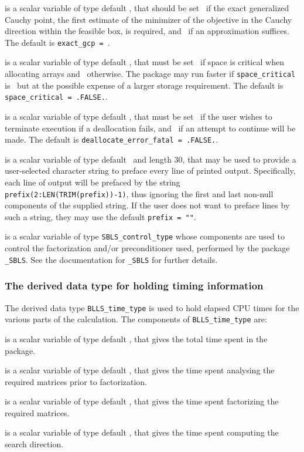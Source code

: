 \documentclass{galahad}
\newcommand{\packagename}{BLLS}
\begin{document}
\begin{description}
 is a scalar variable of type default \logical, that should
be set \true\ if the exact generalized Cauchy point,
the first estimate of the minimizer of the objective in the
Cauchy direction within
the feasible box, is required, and \false\ if an approximation suffices.
The default is {\tt exact\_gcp = \true}.

 is a scalar variable of type default \logical,
that must be set \true\ if space is critical when allocating arrays
and  \false\ otherwise. The package may run faster if
{\tt space\_critical} is \false\ but at the possible expense of a larger
storage requirement. The default is {\tt space\_critical = .FALSE.}.

 is a scalar variable of type default \logical,
that must be set \true\ if the user wishes to terminate execution if
a deallocation  fails, and \false\ if an attempt to continue
will be made. The default is {\tt deallocate\_error\_fatal = .FALSE.}.

 is a scalar variable of type default \character\
and length 30, that may be used to provide a user-selected
character string to preface every line of printed output.
Specifically, each line of output will be prefaced by the string
{\tt prefix(2:LEN(TRIM(prefix))-1)},
thus ignoring the first and last non-null components of the
supplied string. If the user does not want to preface lines by such
a string, they may use the default {\tt prefix = ""}.

 is a scalar variable of type
{\tt SBLS\_control\_type} %
whose components are used to control the factorization and/or
preconditioner used,
performed by the package
{\tt \libraryname\_SBLS}.
See the documentation for {\tt \libraryname\_SBLS} for further details.

\end{description}


\subsubsection{The derived data type for holding timing
 information}\label{typetime}
The derived data type
{\tt \packagename\_time\_type}
is used to hold elapsed CPU times for the various parts of the calculation.
The components of
{\tt \packagename\_time\_type}
are:
\begin{description}
 is a scalar variable of type default \real, that gives
 the total time spent in the package.

 is a scalar variable of type default \real, that gives
 the time spent analysing the required matrices prior to factorization.

 is a scalar variable of type default \real, that gives
 the time spent factorizing the required matrices.

 is a scalar variable of type default \real, that gives
 the time spent computing the search direction.

\end{description}
\end{document}
